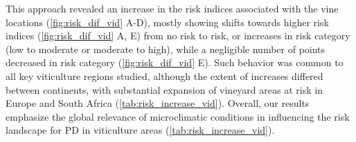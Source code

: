This approach revealed an increase in the risk indices
associated with the vine locations (\cref{fig:risk_dif_vid} A-D), mostly
showing shifts towards higher risk indices (\cref{fig:risk_dif_vid} A, E) from
no risk to risk, or increases in risk category (low to moderate or moderate to
high), while a negligible number of points decreased in risk category
(\cref{fig:risk_dif_vid} E). Such behavior was common to all key viticulture
regions studied, although the extent of increases differed between continents,
with substantial expansion of vineyard areas at risk in Europe and South Africa
(\cref{tab:risk_increase_vid}). Overall, our results emphasize the global
relevance of microclimatic conditions in influencing the risk landscape for PD
in viticulture areas (\cref{tab:risk_increase_vid}).

\begin{table}[H]
    \centering
    \caption[Comparison of PD risk at known grapevine
        locations]{\textbf{Comparison of PD risk at known grapevine locations.}
        Comparison of
        grapevine presence locations at risk in key
        viticulture regions using CHELSA and ERA5 datasets}
    \label{tab:risk_increase_vid}
\end{table}

